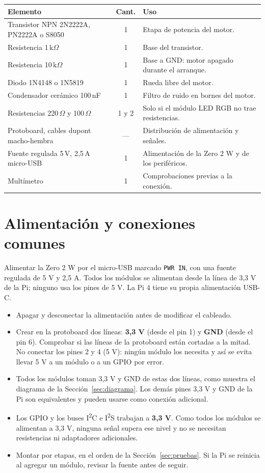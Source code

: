 \documentclass[11pt,a4paper]{article}
\newcommand{\iic}{I\textsuperscript{2}C}
\newcommand{\iis}{I\textsuperscript{2}S}
\begin{document}
\begin{center}
\small
\begin{tabularx}{\linewidth}{lcX}
\toprule
\textbf{Elemento} & \textbf{Cant.} & \textbf{Uso}\\
\midrule
Transistor NPN 2N2222A, PN2222A o S8050 & 1 & Etapa de potencia del motor.\\
Resistencia 1\,k$\Omega$ & 1 & Base del transistor.\\
Resistencia 10\,k$\Omega$ & 1 & Base a GND: motor apagado durante el arranque.\\
Diodo 1N4148 o 1N5819 & 1 & Rueda libre del motor.\\
Condensador cerámico 100\,nF & 1 & Filtro de ruido en bornes del motor.\\
Resistencias 220\,$\Omega$ y 100\,$\Omega$ & 1 y 2 & Solo si el módulo LED RGB no trae resistencias.\\
Protoboard, cables dupont macho-hembra & --- & Distribución de alimentación y señales.\\
Fuente regulada 5\,V, 2,5\,A micro-USB & 1 & Alimentación de la Zero 2 W y de los periféricos.\\
Multímetro & 1 & Comprobaciones previas a la conexión.\\
\bottomrule
\end{tabularx}
\end{center}

\section{Alimentación y conexiones comunes}

Alimentar la Zero 2 W por el micro-USB marcado \texttt{PWR IN}, con una fuente
regulada de 5 V y 2,5 A. Todos los módulos se alimentan desde la línea de
3,3 V de la Pi; ninguno usa los pines de 5 V. La Pi 4 tiene su propia
alimentación USB-C.

\begin{itemize}
  \item Apagar y desconectar la alimentación antes de modificar el cableado.
  \item Crear en la protoboard dos líneas: \textbf{3,3 V} (desde el pin 1) y
  \textbf{GND} (desde el pin 6). Comprobar si las líneas de la protoboard están
  cortadas a la mitad. No conectar los pines 2 y 4 (5 V): ningún módulo los
  necesita y así se evita llevar 5 V a un módulo o a un GPIO por error.
  \item Todos los módulos toman 3,3 V y GND de estas dos líneas, como muestra
  el diagrama de la Sección~\ref{sec:diagrama}. Los demás pines 3,3 V y GND de
  la Pi son equivalentes y pueden usarse como conexión adicional.
  \item Los GPIO y los buses \iic{} e \iis{} trabajan a \textbf{3,3 V}. Como
  todos los módulos se alimentan a 3,3 V, ninguna señal supera ese nivel y no
  se necesitan resistencias ni adaptadores adicionales.
  \item Montar por etapas, en el orden de la Sección~\ref{sec:pruebas}. Si la
  Pi se reinicia al agregar un módulo, revisar la fuente antes de seguir.
\end{itemize}
\end{document}
